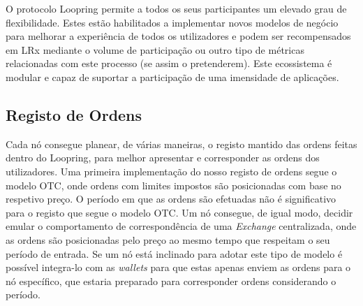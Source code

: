 \documentclass[UTF8,nofonts]{article}
\begin{document}
\begin{multicols}{2}
O protocolo Loopring permite a todos os seus participantes um elevado grau de flexibilidade. Estes estão habilitados a implementar novos modelos de negócio para melhorar a experiência de todos os utilizadores e podem ser recompensados em LRx mediante o volume de participação ou outro tipo de métricas relacionadas com este processo (se assim o pretenderem). Este ecossistema é modular e capaz de suportar a participação de uma imensidade de aplicações. 





\subsection{Registo de Ordens\label{sec:order_book}}

Cada nó consegue planear, de várias maneiras, o registo mantido das ordens feitas dentro do Loopring, para melhor apresentar e corresponder as ordens dos utilizadores. Uma primeira implementação do nosso registo de ordens segue o modelo OTC, onde ordens com limites impostos são posicionadas com base no respetivo preço. O período em que as ordens são efetuadas não é significativo para o registo que segue o modelo OTC. Um nó consegue, de igual modo, decidir emular o comportamento de correspondência de uma \textit{Exchange} centralizada, onde as ordens são posicionadas pelo preço ao mesmo tempo que respeitam o seu período de entrada. Se um nó está inclinado para adotar este tipo de modelo é possível integra-lo com as \textit{wallets} para que estas apenas enviem as ordens para o nó específico, que estaria preparado para corresponder ordens considerando o período. 


\end{multicols}
\end{document}
